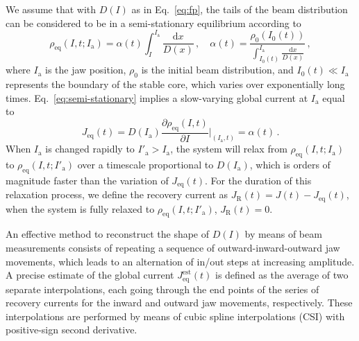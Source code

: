 We assume that with $D(I)$ as in Eq.~\eqref{eq:fp}, the tails of the beam distribution can be considered to be in a semi-stationary equilibrium according to
\begin{equation}
    \rho_\text{eq}(I, t; I_\mathrm{a}) = \alpha(t)\int_I^{I_\mathrm{a}} \frac{\mathrm{d}x}{D(x)}\,,\quad \alpha(t) = \frac{\rho_0(I_0(t))}{\int_{I_0(t)}^{I_\mathrm{a}} \frac{\mathrm{d}x}{D(x)}}\,,
    \label{eq:semi-stationary}
\end{equation}
where $I_\mathrm{a}$ is the jaw position, $\rho_0$ is the initial beam distribution, and $I_0(t)\ll I_\mathrm{a}$ represents the boundary of the stable core, which varies over exponentially long times. Eq.~\eqref{eq:semi-stationary} implies a slow-varying global current at $I_\mathrm{a}$ equal to
\begin{equation}
    J_\text{eq}(t) = D(I_\mathrm{a})\frac{\partial \rho_\text{eq}(I, t)}{\partial I}\bigg|_{(I_\mathrm{a}, t)} = \alpha(t)\,.
\end{equation}
When $I_\mathrm{a}$ is changed rapidly to $I'_\mathrm{a}>I_\mathrm{a}$, the system will relax from $\rho_\text{eq}(I, t; I_\mathrm{a})$ to $\rho_\text{eq}(I, t; I'_\mathrm{a})$ over a timescale proportional to $D(I_\mathrm{a})$, which is orders of magnitude faster than the variation of $J_\text{eq}(t)$. For the duration of this relaxation process, we define the recovery current as $J_\mathrm{R}(t)= J(t) -J_\mathrm{eq}(t)$, when the system is fully relaxed to $\rho_\text{eq}(I, t; I'_\mathrm{a})$, $J_\mathrm{R}(t) = 0$. 

An effective method to reconstruct the shape of $D(I)$ by means of beam measurements consists of repeating a sequence of outward-inward-outward jaw movements, which leads to an alternation of in/out steps at increasing amplitude. A precise estimate of the global current $J_\mathrm{eq}^\mathrm{est}(t)$ is defined as the average of two separate interpolations, each going through the end points of the series of recovery currents for the inward and outward jaw movements, respectively. These interpolations are performed by means of cubic spline interpolations (CSI) with positive-sign second derivative.

